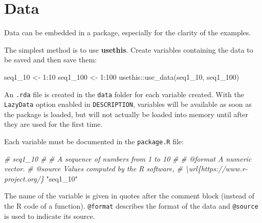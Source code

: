 \documentclass[
  12pt,
  american,
  a4paper,
  extrafontsizes,onecolumn,openright
  ]{memoir}
\newenvironment{Shaded}{\begin{snugshade}}{\end{snugshade}}
\newcommand{\CommentTok}[1]{\textcolor[rgb]{0.56,0.35,0.01}{\textit{#1}}}
\newcommand{\DecValTok}[1]{\textcolor[rgb]{0.00,0.00,0.81}{#1}}
\newcommand{\FunctionTok}[1]{\textcolor[rgb]{0.00,0.00,0.00}{#1}}
\newcommand{\NormalTok}[1]{#1}
\newcommand{\OtherTok}[1]{\textcolor[rgb]{0.56,0.35,0.01}{#1}}
\newcommand{\SpecialCharTok}[1]{\textcolor[rgb]{0.00,0.00,0.00}{#1}}
\newcommand{\StringTok}[1]{\textcolor[rgb]{0.31,0.60,0.02}{#1}}
\begin{document}
\normalsize

\hypertarget{data}{%
\section{Data}\label{data}}

Data can be embedded in a package, especially for the clarity of the examples.

The simplest method is to use \textbf{usethis}.
Create variables containing the data to be saved and then save them:

\scriptsize

\begin{Shaded}
\begin{Highlighting}[]
\NormalTok{seq1\_10 }\OtherTok{\textless{}{-}} \DecValTok{1}\SpecialCharTok{:}\DecValTok{10}
\NormalTok{seq1\_100 }\OtherTok{\textless{}{-}} \DecValTok{1}\SpecialCharTok{:}\DecValTok{100}
\NormalTok{usethis}\SpecialCharTok{::}\FunctionTok{use\_data}\NormalTok{(seq1\_10, seq1\_100)}
\end{Highlighting}
\end{Shaded}

\normalsize

An \texttt{.rda} file is created in the \texttt{data} folder for each variable created.
With the \texttt{LazyData} option enabled in \texttt{DESCRIPTION}, variables will be available as soon as the package is loaded, but will not actually be loaded into memory until after they are used for the first time.

Each variable must be documented in the \texttt{package.R} file:

\scriptsize

\begin{Shaded}
\begin{Highlighting}[]
\CommentTok{\#\textquotesingle{} seq1\_10}
\CommentTok{\#\textquotesingle{}}
\CommentTok{\#\textquotesingle{} A sequence of numbers from 1 to 10}
\CommentTok{\#\textquotesingle{}}
\CommentTok{\#\textquotesingle{} @format A numeric vector.}
\CommentTok{\#\textquotesingle{} @source Values computed by the R software, }
\CommentTok{\#\textquotesingle{}   \textbackslash{}url\{https://www.r{-}project.org/\}}
\StringTok{"seq1\_10"}
\end{Highlighting}
\end{Shaded}

\normalsize

The name of the variable is given in quotes after the comment block (instead of the R code of a function).
\texttt{@format} describes the format of the data and \texttt{@source} is used to indicate its source.
\end{document}
